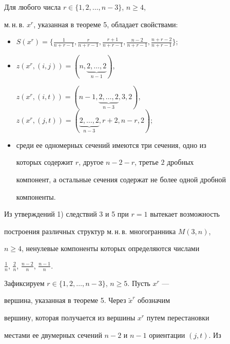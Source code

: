 \begin{cor}


Для любого числа $r\in \{1,2,\dotsc,n-3\}$, $n\geq 4$,


м.\,н.\,в. $x^r$, указанная в теореме 5, обладает свойствами:


\begin{itemize}


\item[1)] $S(x^r)=\{\frac{1}{n+r-1},\frac{r}{n+r-1},


\frac{r+1}{n+r-1},\frac{n-2}{n+r-1},\frac{n+r-2}{n+r-1} \}$;


\item[2)] $z(x^r,(i,j))=(n,\underbrace{2,\dotsc,2}_{n-1})$,


$z(x^r,(i,t))=(n-1,\underbrace{2,\dotsc,2}_{n-3}


,3,2)$,\\


$z(x^r,(j,t))=(\underbrace{2,\dotsc,2}_{n-3},r+2,n-r,2)$;


\item[3)] среди ее одномерных сечений имеются три сечения, одно из


которых содержит $r$, другое $n-2-r$, третье $2$ дробных


компонент, а остальные сечения содержат не более одной дробной


компоненты.


\end{itemize}


\end{cor}





Из утверждений 1) следствий 3 и 5 при $r=1$ вытекает возможность


построения различных структур м.\,н.\,в. многогранника $M(3,n)$,


$n\geq 4$, ненулевые компоненты которых определяются числами


$\frac{1}{n}$, $\frac{2}{n}$, $\frac{n-2}{n}$, $\frac{n-1}{n}$.





Зафиксируем $r\in \{1,2,\dotsc,n-3\}$, $n\geq 5$. Пусть $x^r$ ---


вершина, указанная в теореме 5. Через $\widetilde{x}^r$ обозначим


вершину, которая получается из вершины $x^r$ путем перестановки


местами ее двумерных сечений $n-2$ и $n-1$ ориентации $(j,t)$. Из


